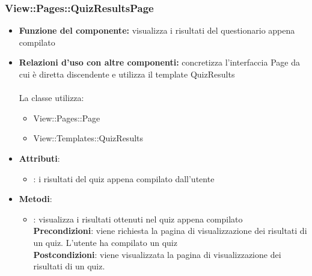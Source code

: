 \subsubsection{View::Pages::QuizResultsPage}
\begin{itemize}
\item\textbf{Funzione del componente:} visualizza i risultati del questionario appena compilato
				\item\textbf{Relazioni d'uso con altre componenti:} concretizza l'interfaccia Page da cui è diretta discendente e utilizza il template QuizResults\\ \\
La classe utilizza:
	\begin{itemize}
		\item View::Pages::Page\\
		\item View::Templates::QuizResults\\
	\end{itemize}
\item\textbf{Attributi}:
	\begin{itemize}
		\item{}: i risultati del quiz appena compilato dall'utente\\
	\end{itemize}
\item\textbf{Metodi}:
	\begin{itemize}
		\item{}: visualizza i risultati ottenuti nel quiz appena compilato\\
		\textbf{Precondizioni}: viene richiesta la pagina di visualizzazione dei risultati di un quiz. L'utente ha compilato un quiz\\
		\textbf{Postcondizioni}: viene visualizzata la pagina di visualizzazione dei risultati di un quiz.\\
	\end{itemize}
\end{itemize}

